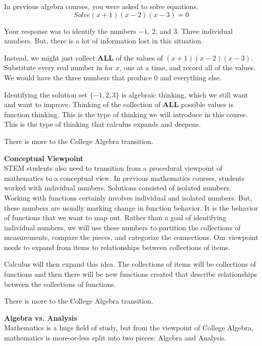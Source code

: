 \documentclass{ximera}
\begin{document}
\begin{idea}
In previous algebra courses, you were asked to solve equations.
\[
Solve (x+1)(x-2)(x-3) = 0
\]

Your response was to identify the numbers $-1$, $2$, and $3$. Three individual numbers. But, there is a lot of information lost in this situation.

Instead, we might just collect \textbf{ALL} of the values of $(x+1)(x-2)(x-3)$.  Substitute every real number in for $x$, one at a time, and record all of the values. We would have the three numbers that produce $0$ and everything else.

Identifying the solution set $\{ -1, 2, 3 \}$ is algebraic thinking, which we still want and want to improve.  Thinking of the collection of \textbf{ALL} possible values is function thinking.  This is the type of thinking we will introduce in this course.  This is the type of thinking that calculus expands and deepens.

\end{idea}

There is more to the College Algebra transition.

\textbf{Conceptual Viewpoint} \\
STEM students also need to transition from a procedural viewpoint of mathematics to a conceptual view. In previous mathematics courses, students worked with individual numbers. Solutions consisted of isolated numbers. Working with functions certainly involves individual and isolated numbers. But, these numbers are usually marking change in function behavior. It is the behavior of functions that we want to map out. Rather than a goal of identifying individual numbers, we will use these numbers to partition the collections of measurements, compare the pieces, and categorize the connections. Our viewpoint needs to expand from items to relationships between collections of items.

Calculus will then expand this idea.  The collections of items will be collections of functions and then there will be new functions created that describe relationships between the collections of functions.

There is more to the College Algebra transition.







\textbf{Algebra vs. Analysis} \\
Mathematics is a huge field of study, but from the viewpoint of College Algebra, mathematics is more-or-less split into two pieces: Algebra and Analysis.
\end{document}
